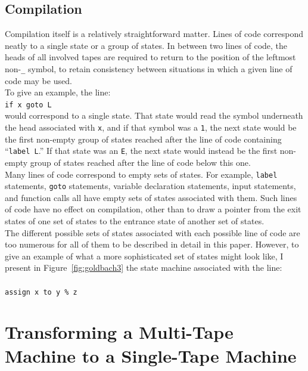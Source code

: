 \documentclass[11pt]{report}
\begin{document}
\subsection{Compilation \label{compilation}}

Compilation itself is a relatively straightforward matter. Lines of code correspond neatly to a single state or a group of states. In between two lines of code, the heads of all involved tapes are required to return to the position of the leftmost non-\texttt{\_} symbol, to retain consistency between situations in which a given line of code may be used. \\

To give an example, the line: \\
 
\texttt{if x goto L} \\

\noindent would correspond to a single state. That state would read the symbol underneath the head associated with \texttt{x}, and if that symbol was a \texttt{1}, the next state would be the first non-empty group of states reached after the line of code containing ``\texttt{label L}.'' If that state was an \texttt{E}, the next state would instead be the first non-empty group of states reached after the line of code below this one.\\

Many lines of code correspond to empty sets of states. For example, \texttt{label} statements, \texttt{goto} statements, variable declaration statements, input statements, and function calls all have empty sets of states associated with them. Such lines of code have no effect on compilation, other than to draw a pointer from the exit states of one set of states to the entrance state of another set of states. \\

The different possible sets of states associated with each possible line of code are too numerous for all of them to be described in detail in this paper. However, to give an example of what a more sophisticated set of states might look like, I present in Figure~\ref{fig:goldbach3} the state machine associated with the line: \\ \\
\texttt{assign x to y \% z} \\

\section{Transforming a Multi-Tape Machine to a Single-Tape Machine \label{sec:mttost}}
\end{document}
